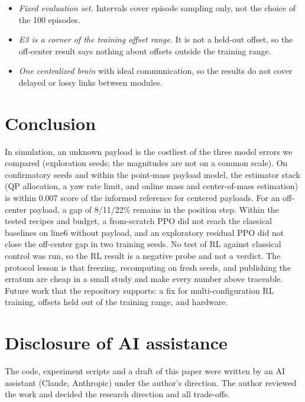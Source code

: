 \documentclass[conference]{IEEEtran}
\begin{document}
\begin{itemize}
\item \emph{Fixed evaluation set.} Intervals cover episode sampling only, not the choice of the 100 episodes. %
\item \emph{E3 is a corner of the training offset range.} It is not a held-out offset, so the off-center result says nothing about offsets outside the training range. %
\item \emph{One centralized brain} with ideal communication, so the results do not cover delayed or lossy links between modules.
\end{itemize}

\section{Conclusion}
In simulation, an unknown payload is the costliest of the three model errors we compared (exploration seeds; the magnitudes are not on a common scale).
On confirmatory seeds and within the point-mass payload model, the estimator stack (QP allocation, a yaw rate limit, and online mass and center-of-mass estimation) is within 0.007 score of the informed reference for centered payloads.
For an off-center payload, a gap of 8/11/22\% remains in the position step. %
Within the tested recipes and budget, a from-scratch PPO did not reach the classical baselines on line6 without payload, and an exploratory residual PPO did not close the off-center gap in two training seeds. %
No test of RL against classical control was run, so the RL result is a negative probe and not a verdict.
The protocol lesson is that freezing, recomputing on fresh seeds, and publishing the erratum are cheap in a small study and make every number above traceable.
Future work that the repository supports: a fix for multi-configuration RL training, offsets held out of the training range, and hardware.

\section*{Disclosure of AI assistance}
The code, experiment scripts and a draft of this paper were written by an AI assistant (Claude, Anthropic) under the author's direction.
The author reviewed the work and decided the research direction and all trade-offs.

\label{end:body}
\appendix
\end{document}
